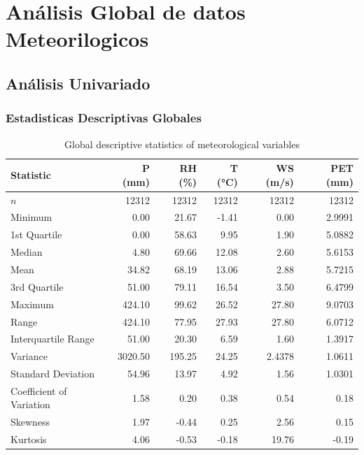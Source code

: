 \chapter{Análisis Global de datos Meteorilogicos}
\section{Análisis Univariado}

\subsection{Estadisticas Descriptivas Globales}

\begin{table}[H]
\centering
\caption{Global descriptive statistics of meteorological variables}
\label{tab:global_statistics}
\small
\begin{tabular}{lrrrrr}
\toprule
\textbf{Statistic} & \textbf{P (mm)} & \textbf{RH (\%)} & \textbf{T (°C)} & \textbf{WS (m/s)} & \textbf{PET (mm)} \\
\midrule
$n$                         & 12312 & 12312 & 12312 & 12312 & 12312 \\
Minimum                    & 0.00   & 21.67  & -1.41  & 0.00   & 2.9991 \\
1st Quartile               & 0.00   & 58.63  & 9.95   & 1.90   & 5.0882 \\
Median                     & 4.80   & 69.66  & 12.08  & 2.60   & 5.6153 \\
Mean                       & 34.82  & 68.19  & 13.06  & 2.88   & 5.7215 \\
3rd Quartile               & 51.00  & 79.11  & 16.54  & 3.50   & 6.4799 \\
Maximum                    & 424.10 & 99.62  & 26.52  & 27.80  & 9.0703 \\
Range                      & 424.10 & 77.95  & 27.93  & 27.80  & 6.0712 \\
Interquartile Range        & 51.00  & 20.30  & 6.59   & 1.60   & 1.3917 \\
Variance                   & 3020.50 & 195.25 & 24.25  & 2.4378 & 1.0611 \\
Standard Deviation         & 54.96  & 13.97  & 4.92   & 1.56   & 1.0301 \\
Coefficient of Variation   & 1.58   & 0.20   & 0.38   & 0.54   & 0.18 \\
Skewness                 & 1.97   & -0.44  & 0.25   & 2.56   & 0.15 \\
Kurtosis                   & 4.06   & -0.53  & -0.18  & 19.76  & -0.19 \\
\bottomrule
\end{tabular}
\end{table}


